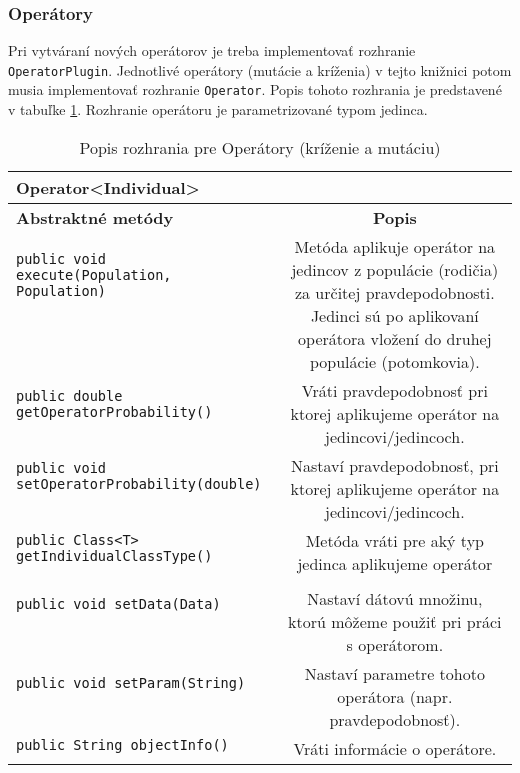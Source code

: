 \subsubsection*{Operátory}
Pri vytváraní nových operátorov je treba implementovať rozhranie \verb|OperatorPlugin|. Jednotlivé operátory (mutácie a kríženia) v tejto knižnici potom musia implementovať rozhranie \verb|Operator|. Popis tohoto rozhrania je predstavené v tabuľke \ref{fig:tabop}.
Rozhranie operátoru je parametrizované typom jedinca.


\begin{table}
\centering
\begin{tabular}{|l|c|}
\hline
\textbf{Operator<Individual>} & \\
\hline\hline
\textbf{Abstraktné metódy} & \textbf{Popis} \\
\hline
\verb|public void execute(Population, Population)| & \multirow{7}{5cm}{Metóda aplikuje operátor na jedincov z populácie (rodičia) za určitej pravdepodobnosti. Jedinci sú po aplikovaní operátora vložení do druhej populácie (potomkovia). } \\
& \\
& \\
& \\
& \\
& \\
& \\
\hline
\verb|public double getOperatorProbability()| & \multirow{3}{5cm}{Vráti pravdepodobnosť pri ktorej aplikujeme operátor na jedincovi/jedincoch.} \\
& \\
& \\
\hline
\verb|public void setOperatorProbability(double)| & \multirow{4}{5cm}{Nastaví pravdepodobnosť, pri ktorej aplikujeme operátor na jedincovi/jedincoch.} \\
& \\
& \\
& \\
\hline
\verb|public Class<T> getIndividualClassType()| & \multirow{2}{5cm}{Metóda vráti pre aký typ jedinca aplikujeme operátor} \\
& \\
& \\
\hline
\verb|public void setData(Data)| & \multirow{4}{5cm}{Nastaví dátovú množinu, ktorú môžeme použiť pri práci s operátorom.} \\
& \\
& \\
& \\
\hline
\verb|public void setParam(String)| & \multirow{3}{5cm}{Nastaví parametre tohoto operátora (napr. pravdepodobnosť).} \\
& \\
& \\
\hline
\verb|public String objectInfo()| & \multirow{2}{5cm}{Vráti informácie o operátore.} \\
& \\ 
\hline
\end{tabular}
\caption{Popis rozhrania pre Operátory (kríženie a mutáciu)}\label{fig:tabop}
\end{table}


